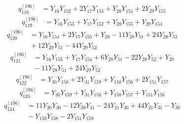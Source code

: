 \begin{equation}\label{q196:row:118}
\begin{aligned}
q_{118}^{[196]} &={} Y_{16}Y_{152} + 2Y_{17}Y_{153} + Y_{28}Y_{154} + 2Y_{29}Y_{155}
\end{aligned}
\end{equation}
\begin{equation}\label{q196:row:119}
\begin{aligned}
q_{119}^{[196]} &={} Y_{16}Y_{153} + Y_{17}Y_{152} + Y_{28}Y_{155} + Y_{29}Y_{154}
\end{aligned}
\end{equation}
\begin{equation}\label{q196:row:120}
\begin{aligned}
q_{120}^{[196]} &={} Y_{16}Y_{154} + 2Y_{17}Y_{155} + Y_{28} - 11Y_{28}Y_{51} + 24Y_{28}Y_{52}\\
&{} + 12Y_{29}Y_{51} - 44Y_{29}Y_{52}
\end{aligned}
\end{equation}
\begin{equation}\label{q196:row:121}
\begin{aligned}
q_{121}^{[196]} &={} Y_{16}Y_{155} + Y_{17}Y_{154} + 6Y_{28}Y_{51} - 22Y_{28}Y_{52} + Y_{29}\\
&{} - 11Y_{29}Y_{51} + 24Y_{29}Y_{52}
\end{aligned}
\end{equation}
\begin{equation}\label{q196:row:122}
\begin{aligned}
q_{122}^{[196]} &={} Y_{30}Y_{158} + 2Y_{31}Y_{159} + Y_{150}Y_{156} + 2Y_{151}Y_{157}
\end{aligned}
\end{equation}
\begin{equation}\label{q196:row:123}
\begin{aligned}
q_{123}^{[196]} &={} Y_{30}Y_{159} + Y_{31}Y_{158} + Y_{150}Y_{157} + Y_{151}Y_{156}
\end{aligned}
\end{equation}
\begin{equation}\label{q196:row:124}
\begin{aligned}
q_{124}^{[196]} &={} 11Y_{20}Y_{30} - 12Y_{20}Y_{31} - 24Y_{21}Y_{30} + 44Y_{21}Y_{31} - Y_{30}\\
&{} - Y_{150}Y_{158} - 2Y_{151}Y_{159}
\end{aligned}
\end{equation}
